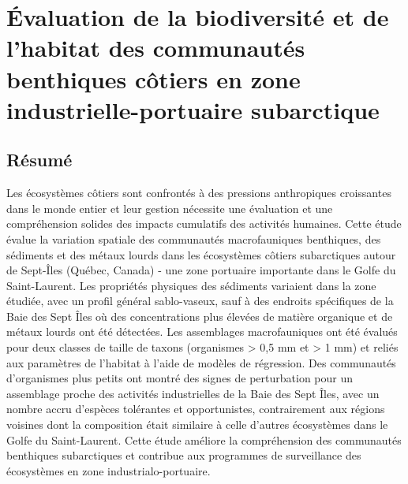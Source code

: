 \chapter{Évaluation de la biodiversité et de l'habitat des communautés benthiques côtiers en zone industrielle-portuaire subarctique}
\label{chap1}

\section{Résumé}
Les écosystèmes côtiers sont confrontés à des pressions anthropiques croissantes dans le monde entier et leur gestion nécessite une évaluation et une compréhension solides des impacts cumulatifs des activités humaines. Cette étude évalue la variation spatiale des communautés macrofauniques benthiques, des sédiments et des métaux lourds dans les écosystèmes côtiers subarctiques autour de Sept-Îles (Québec, Canada) - une zone portuaire importante dans le Golfe du Saint-Laurent. Les propriétés physiques des sédiments variaient dans la zone étudiée, avec un profil général sablo-vaseux, sauf à des endroits spécifiques de la Baie des Sept Îles où des concentrations plus élevées de matière organique et de métaux lourds ont été détectées. Les assemblages macrofauniques ont été évalués pour deux classes de taille de taxons (organismes > 0,5 mm et > 1 mm) et reliés aux paramètres de l'habitat à l'aide de modèles de régression. Des communautés d'organismes plus petits ont montré des signes de perturbation pour un assemblage proche des activités industrielles de la Baie des Sept Îles, avec un nombre accru d'espèces tolérantes et opportunistes, contrairement aux régions voisines dont la composition était similaire à celle d'autres écosystèmes dans le Golfe du Saint-Laurent. Cette étude améliore la compréhension des communautés benthiques subarctiques et contribue aux programmes de surveillance des écosystèmes en zone industrialo-portuaire. \linebreak[4]

